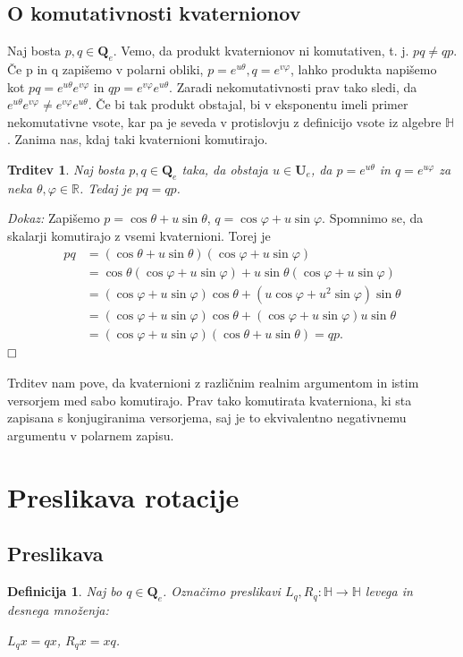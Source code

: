 \documentclass[a4paper,12pt]{article}
\def\R{\mathbb{R}} %
\def\H{\mathbb{H}} %
\def\Qe{\textbf{Q}_{e}} %
\def\Ue{\textbf{U}_{e}} %
\def\qed{$\hfill\Box$}   %
\newtheorem{trditev}{Trditev}
\newtheorem{definicija}{Definicija}
\begin{document}
\subsection{O komutativnosti kvaternionov}
Naj bosta $p,q \in \Qe$. Vemo, da produkt kvaternionov ni komutativen, t. j. $p q \neq q p$.
Če p in q zapišemo v polarni obliki, $p = e^{u\theta}, q = e^{v\varphi}$, lahko produkta napišemo kot $p q = e^{u\theta} e^{v\varphi}$ in $q p = e^{v\varphi}e^{u\theta}$.
Zaradi nekomutativnosti prav tako sledi, da $e^{u\theta} e^{v\varphi} \neq e^{v\varphi}e^{u\theta}$. Če bi tak produkt obstajal, bi v eksponentu imeli primer nekomutativne vsote,
kar pa je seveda v protislovju z definicijo vsote iz algebre $\H$.
\newpage
Zanima nas, kdaj taki kvaternioni komutirajo.
\begin{trditev}
Naj bosta $p,q \in \Qe$ taka, da obstaja $u \in \Ue$, da $p = e^{u\theta}$ in $q = e^{u\varphi}$ za neka $\theta, \varphi \in \R$.
Tedaj je $pq = qp$.
\end{trditev}
\noindent
{\em Dokaz:\/} Zapišemo $p = \cos\theta + u\sin\theta$, $q = \cos\varphi + u\sin\varphi$.
Spomnimo se, da skalarji komutirajo z vsemi kvaternioni. Torej je
\begin{align*}
   pq & = (\cos\theta + u\sin\theta)(\cos\varphi + u\sin\varphi)\\
   & = \cos\theta(\cos\varphi + u\sin\varphi) + u\sin\theta(\cos\varphi + u\sin\varphi)\\
   & = (\cos\varphi + u\sin\varphi)\cos\theta + (u\cos\varphi + u^2\sin\varphi)\sin\theta\\
   & = (\cos\varphi + u\sin\varphi)\cos\theta + (\cos\varphi + u\sin\varphi)u\sin\theta\\
   & = (\cos\varphi + u\sin\varphi)(\cos\theta + u\sin\theta) = qp.
\end{align*}
\qed

Trditev nam pove, da kvaternioni z različnim realnim argumentom in istim versorjem med sabo komutirajo.
Prav tako komutirata kvaterniona, ki sta zapisana s konjugiranima versorjema, saj je to ekvivalentno negativnemu argumentu v polarnem zapisu.

\section{Preslikava rotacije}
\subsection{Preslikava}
\begin{definicija}
Naj bo $q \in \Qe$. Označimo preslikavi $L_{q}, R_{q} : \H \to \H$ levega in desnega množenja:
\begin{center}
   $L_{q}x = qx$, $R_{q}x = xq$.
\end{center}
\end{definicija}
\end{document}

